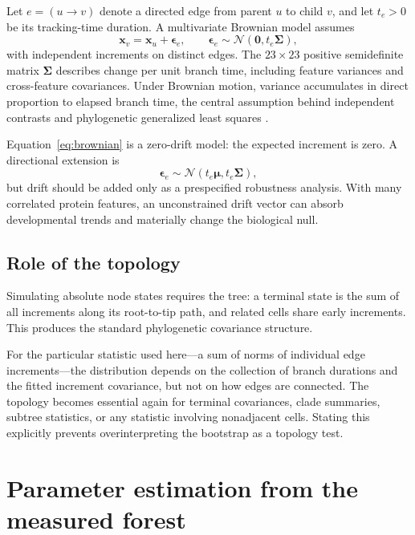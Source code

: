\documentclass[10pt]{article}
\newcommand{\Normal}{\mathcal{N}}
\begin{document}
Let $e=(u\rightarrow v)$ denote a directed edge from parent $u$ to child $v$,
and let $t_e>0$ be its tracking-time duration.  A multivariate Brownian model
assumes
\begin{equation}
  \mathbf{x}_v = \mathbf{x}_u + \boldsymbol\epsilon_e,
  \qquad
  \boldsymbol\epsilon_e \sim
  \Normal\!\left(\mathbf{0},t_e\boldsymbol\Sigma\right),
  \label{eq:brownian}
\end{equation}
with independent increments on distinct edges.  The $23\times23$ positive
semidefinite matrix $\boldsymbol\Sigma$ describes change per unit branch time,
including feature variances and cross-feature covariances.  Under Brownian
motion, variance accumulates in direct proportion to elapsed branch time, the
central assumption behind independent contrasts and phylogenetic generalized
least squares \cite{felsenstein1985,freckleton2012}.

Equation~\eqref{eq:brownian} is a zero-drift model: the expected increment is
zero.  A directional extension is
\[
  \boldsymbol\epsilon_e \sim
  \Normal(t_e\boldsymbol\mu,t_e\boldsymbol\Sigma),
\]
but drift should be added only as a prespecified robustness analysis.  With
many correlated protein features, an unconstrained drift vector can absorb
developmental trends and materially change the biological null.

\subsection{Role of the topology}

Simulating absolute node states requires the tree: a terminal state is the sum
of all increments along its root-to-tip path, and related cells share early
increments.  This produces the standard phylogenetic covariance structure.

For the particular statistic used here---a sum of norms of individual edge
increments---the distribution depends on the collection of branch durations
and the fitted increment covariance, but not on how edges are connected.  The
topology becomes essential again for terminal covariances, clade summaries,
subtree statistics, or any statistic involving nonadjacent cells.  Stating
this explicitly prevents overinterpreting the bootstrap as a topology test.

\section{Parameter estimation from the measured forest}
\end{document}
